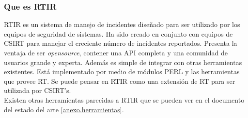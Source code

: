 \subsubsection{Que es RTIR}
RTIR es un sistema de manejo de incidentes diseñado para ser utilizado por los 
equipos de seguridad de sistemas. Ha sido creado en conjunto con equipos de CSIRT para manejar el creciente número de incidentes reportados.
Presenta la ventaja de ser \textit{opensource}, contener una API completa y una comunidad 
de usuarios grande y experta. Además es simple de integrar con otras 
herramientas existentes. Está implementado por medio de módulos PERL y las 
herramientas que provee RT. Se puede pensar en RTIR como una extensión de RT 
para ser utilizada por CSIRT's.\\

Existen otras herramientas parecidas a RTIR que se pueden ver en el documento del estado del arte \ref{anexo.herramientas}.